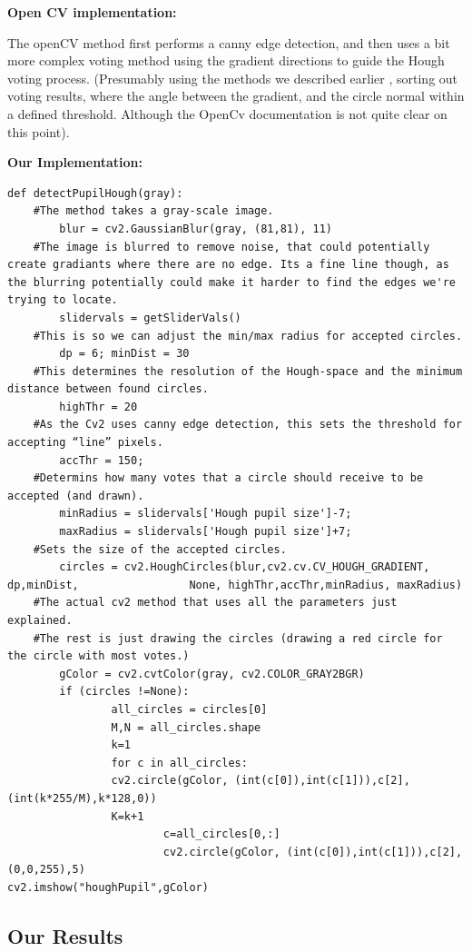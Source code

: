 \textbf{Open CV implementation:}

The openCV method first performs a canny edge detection, and then uses a
bit more complex voting method using the gradient directions to guide
the Hough voting process. (Presumably using the methods we described
earlier , sorting out voting results, where the angle between the
gradient, and the circle normal within a defined threshold. Although the
OpenCv documentation is not quite clear on this point).

\textbf{Our Implementation:}

\begin{verbatim}
def detectPupilHough(gray):
    #The method takes a gray-scale image.
        blur = cv2.GaussianBlur(gray, (81,81), 11)
    #The image is blurred to remove noise, that could potentially create gradiants where there are no edge. Its a fine line though, as the blurring potentially could make it harder to find the edges we're trying to locate.
        slidervals = getSliderVals()
    #This is so we can adjust the min/max radius for accepted circles.
        dp = 6; minDist = 30
    #This determines the resolution of the Hough-space and the minimum distance between found circles.
        highThr = 20
    #As the Cv2 uses canny edge detection, this sets the threshold for accepting “line” pixels.
        accThr = 150;
    #Determins how many votes that a circle should receive to be accepted (and drawn).
        minRadius = slidervals['Hough pupil size']-7;
        maxRadius = slidervals['Hough pupil size']+7;
    #Sets the size of the accepted circles.
        circles = cv2.HoughCircles(blur,cv2.cv.CV_HOUGH_GRADIENT, dp,minDist,                 None, highThr,accThr,minRadius, maxRadius)
    #The actual cv2 method that uses all the parameters just explained.
    #The rest is just drawing the circles (drawing a red circle for the circle with most votes.)
        gColor = cv2.cvtColor(gray, cv2.COLOR_GRAY2BGR)
        if (circles !=None):
                all_circles = circles[0]
                M,N = all_circles.shape
                k=1
                for c in all_circles:
                cv2.circle(gColor, (int(c[0]),int(c[1])),c[2], (int(k*255/M),k*128,0))
                K=k+1
                        c=all_circles[0,:]
                        cv2.circle(gColor, (int(c[0]),int(c[1])),c[2], (0,0,255),5)
cv2.imshow("houghPupil",gColor)
\end{verbatim}
\subsection{Our Results}

